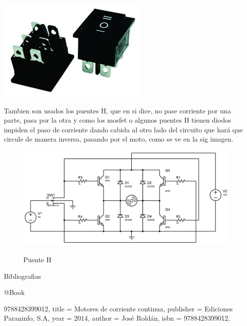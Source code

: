 \documentclass[letterpaper]{article}
\begin{document}
\includegraphics[scale=1]{chuicheinversor.jpg} 
\begin{large}
Tambien son usados los puentes H, que en si dice, no pase corriente por una parte, pasa por la otra y como los mosfet o algunos puentes H tienen diodos impiden el paso de corriente dando cabida al otro lado del circuito que hará que circule de manera inversa, pasando por el moto, como se ve en la sig imagen.\\
\end{large}
\begin{figure}[hbtp]
\caption{Puente H}
\centering
\includegraphics[scale=1.3]{puenteashe.png}\\
\end{figure}

\begin{huge}
Bibliografias\\
\end{huge}
@Book{ 9788428399012,
  title     = {Motores de corriente continua},
  publisher = {Ediciones Paraninfo, S.A},
  year      = {2014},
  author    = {José Roldán},
  isbn      = {9788428399012},

}
\end{document}
